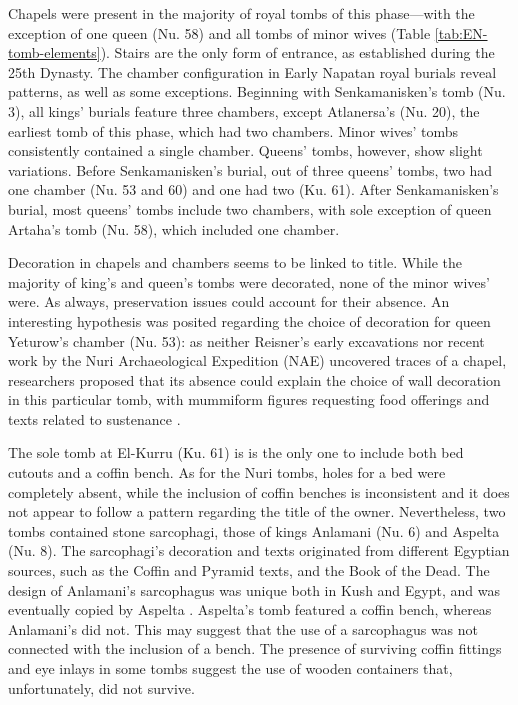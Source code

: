Chapels were present in the majority of royal tombs of this phase---with the exception of one queen (Nu. 58) and all tombs of minor wives (Table \ref{tab:EN-tomb-elements}). Stairs are the only form of entrance, as established during the 25th Dynasty. The chamber configuration in Early Napatan royal burials reveal patterns, as well as some exceptions. Beginning with Senkamanisken's tomb (Nu. 3), all kings' burials feature three chambers, except Atlanersa's (Nu. 20), the earliest tomb of this phase, which had two chambers. Minor wives' tombs consistently contained a single chamber. Queens' tombs, however, show slight variations. Before Senkamanisken's burial, out of three queens' tombs, two had one chamber (Nu. 53 and 60) and one had two (Ku. 61). After Senkamanisken's burial, most queens' tombs include two chambers, with sole exception of queen Artaha's tomb (Nu. 58), which included one chamber.


Decoration in chapels and chambers seems to be linked to title. While the majority of king's and queen's tombs were decorated, none of the minor wives' were. As always, preservation issues could account for their absence. An interesting hypothesis was posited regarding the choice of decoration for queen Yeturow's chamber (Nu. 53): as neither Reisner's early excavations nor recent work by the Nuri Archaeological Expedition (NAE) uncovered traces of a chapel, researchers proposed that its absence could explain the choice of wall decoration in this particular tomb, with mummiform figures requesting food offerings and texts related to sustenance \parencites[p.~201]{strongReexaminingTombQueen2021}.


The sole tomb at El-Kurru (Ku. 61) is is the only one to include both bed cutouts and a coffin bench. As for the Nuri tombs, holes for a bed were completely absent, while the inclusion of coffin benches is inconsistent and it does not appear to follow a pattern regarding the title of the owner. Nevertheless, two tombs contained stone sarcophagi, those of kings Anlamani (Nu. 6) and Aspelta (Nu. 8). The sarcophagi's decoration and texts originated from different Egyptian sources, such as the Coffin and Pyramid texts, and the Book of the Dead. The design of Anlamani's sarcophagus was unique both in Kush and Egypt, and was eventually copied by Aspelta \parencites{dollTextsDecorationNapatan1978, dollIdentificationSignificanceTexts1982, dollRoyalMortuaryCult2014}. Aspelta's tomb featured a coffin bench, whereas Anlamani's did not. This may suggest that the use of a sarcophagus was not connected with the inclusion of a bench. The presence of surviving coffin fittings and eye inlays in some tombs suggest the use of wooden containers that, unfortunately, did not survive.


